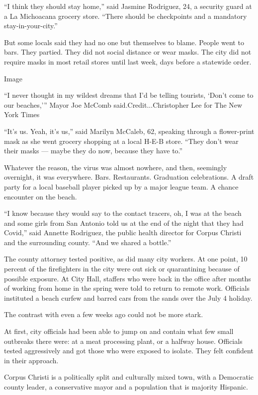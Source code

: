 ``I think they should stay home,'' said Jasmine Rodriguez, 24, a
security guard at a La Michoacana grocery store. ``There should be
checkpoints and a mandatory stay-in-your-city.''

But some locals said they had no one but themselves to blame. People
went to bars. They partied. They did not social distance or wear masks.
The city did not require masks in most retail stores until last week,
days before a statewide order.

Image

``I never thought in my wildest dreams that I'd be telling tourists,
`Don't come to our beaches,''' Mayor Joe McComb
said.Credit...Christopher Lee for The New York Times

``It's us. Yeah, it's us,'' said Marilyn McCaleb, 62, speaking through a
flower-print mask as she went grocery shopping at a local H-E-B store.
``They don't wear their masks --- maybe they do now, because they have
to.''

Whatever the reason, the virus was almost nowhere, and then, seemingly
overnight, it was everywhere. Bars. Restaurants. Graduation
celebrations. A draft party for a local baseball player picked up by a
major league team. A chance encounter on the beach.

``I know because they would say to the contact tracers, oh, I was at the
beach and some girls from San Antonio told us at the end of the night
that they had Covid,'' said Annette Rodriguez, the public health
director for Corpus Christi and the surrounding county. ``And we shared
a bottle.''

The county attorney tested positive, as did many city workers. At one
point, 10 percent of the firefighters in the city were out sick or
quarantining because of possible exposure. At City Hall, staffers who
were back in the office after months of working from home in the spring
were told to return to remote work. Officials instituted a beach curfew
and barred cars from the sands over the July 4 holiday.

The contrast with even a few weeks ago could not be more stark.

At first, city officials had been able to jump on and contain what few
small outbreaks there were: at a meat processing plant, or a halfway
house. Officials tested aggressively and got those who were exposed to
isolate. They felt confident in their approach.

Corpus Christi is a politically split and culturally mixed town, with a
Democratic county leader, a conservative mayor and a population that is
majority Hispanic.

